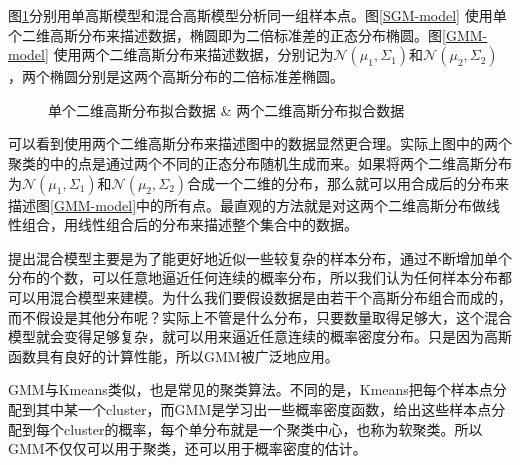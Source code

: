 \documentclass[UTF8]{ctexart}
\begin{document}
图\ref{SGM-model&GMM-model}分别用单高斯模型和混合高斯模型分析同一组样本点。图\ref{SGM-model} 使用单个二维高斯分布来描述数据，椭圆即为二倍标准差的正态分布椭圆。图\ref{GMM-model} 使用两个二维高斯分布来描述数据，分别记为$\mathcal N({\mu}_1,{\Sigma}_1)$和$\mathcal N({\mu}_2,{\Sigma}_2)$，两个椭圆分别是这两个高斯分布的二倍标准差椭圆。

\begin{figure}[!h]
	\centering
	\quad  
	\caption{单个二维高斯分布拟合数据 \& 两个二维高斯分布拟合数据}
	\label{SGM-model&GMM-model}
\end{figure}

可以看到使用两个二维高斯分布来描述图中的数据显然更合理。实际上图中的两个聚类的中的点是通过两个不同的正态分布随机生成而来。如果将两个二维高斯分布为$\mathcal N({\mu}_1,{\Sigma}_1)$和$\mathcal N({\mu}_2,{\Sigma}_2)$合成一个二维的分布，那么就可以用合成后的分布来描述图\ref{GMM-model}中的所有点。最直观的方法就是对这两个二维高斯分布做线性组合，用线性组合后的分布来描述整个集合中的数据。

提出混合模型主要是为了能更好地近似一些较复杂的样本分布，通过不断增加单个分布的个数，可以任意地逼近任何连续的概率分布，所以我们认为任何样本分布都可以用混合模型来建模。为什么我们要假设数据是由若干个高斯分布组合而成的，而不假设是其他分布呢？实际上不管是什么分布，只要数量取得足够大，这个混合模型就会变得足够复杂，就可以用来逼近任意连续的概率密度分布。只是因为高斯函数具有良好的计算性能，所以GMM被广泛地应用。

GMM与Kmeans类似，也是常见的聚类算法。不同的是，Kmeans把每个样本点分配到其中某一个cluster，而GMM是学习出一些概率密度函数，给出这些样本点分配到每个cluster的概率，每个单分布就是一个聚类中心，也称为软聚类。所以GMM不仅仅可以用于聚类，还可以用于概率密度的估计。
\end{document}
